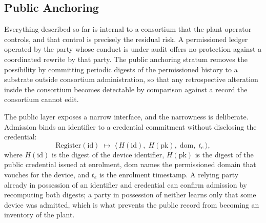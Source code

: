 \subsection{Public Anchoring}
\label{sec:strata-public}
Everything described so far is internal to a consortium that the plant operator controls, and that control is precisely the residual risk. A permissioned ledger operated by the party whose conduct is under audit offers no protection against a coordinated rewrite by that party. The public anchoring stratum removes the possibility by committing periodic digests of the permissioned history to a substrate outside consortium administration, so that any retrospective alteration inside the consortium becomes detectable by comparison against a record the consortium cannot edit.

The public layer exposes a narrow interface, and the narrowness is deliberate. Admission binds an identifier to a credential commitment without disclosing the credential:
\begin{equation}
\label{eq:register}
\mathrm{Register}(\mathrm{id}) \;\longmapsto\; \big\langle \, H(\mathrm{id}), \; H(\mathrm{pk}), \; \mathrm{dom}, \; t_e \, \big\rangle ,
\end{equation}
where $H(\mathrm{id})$ is the digest of the device identifier, $H(\mathrm{pk})$ is the digest of the public credential issued at enrolment, $\mathrm{dom}$ names the permissioned domain that vouches for the device, and $t_e$ is the enrolment timestamp. A relying party already in possession of an identifier and credential can confirm admission by recomputing both digests; a party in possession of neither learns only that some device was admitted, which is what prevents the public record from becoming an inventory of the plant.

